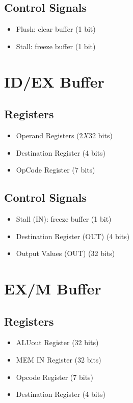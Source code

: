 \documentclass[12pt]{report}
\begin{document}
\subsection{Control Signals}
\begin{itemize}
    \item Flush: clear buffer (1 bit)
    \item Stall: freeze buffer (1 bit)
\end{itemize}

\section{ID/EX Buffer}

\subsection{Registers}
\begin{itemize}
    \item Operand Registers (2$X$32 bits)
    \item Destination Register (4 bits)
    \item OpCode Register (7 bits)
\end{itemize}

\subsection{Control Signals}
\begin{itemize}
    \item Stall (IN): freeze buffer (1 bit)
    \item Destination Register (OUT) (4 bits)
    \item Output Values (OUT) (32 bits)
\end{itemize}

\section{EX/M Buffer}

\subsection{Registers}
\begin{itemize}
    \item ALUout Register (32 bits)
    \item MEM IN Register (32 bits)
    \item Opcode Register (7 bits)
    \item Destination Register (4 bits)
\end{itemize}
\end{document}
